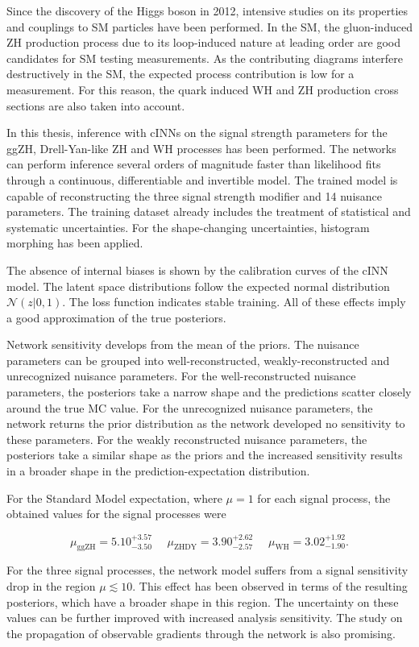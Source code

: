 \label{sec:conclusion}

Since the discovery of the Higgs boson in 2012, intensive studies on its properties and couplings to SM particles have been performed. In the SM, the gluon-induced ZH production process due to its loop-induced nature at leading order are good candidates for SM testing measurements. As the contributing diagrams interfere destructively in the SM, the expected process contribution is low for a measurement. For this reason, the quark induced WH and ZH production cross sections are also taken into account.

In this thesis, inference with cINNs on the signal strength parameters for the ggZH, Drell-Yan-like ZH and WH processes has been performed. The networks can perform inference several orders of magnitude faster than likelihood fits through a continuous, differentiable and invertible model. The trained model is capable of reconstructing the three signal strength modifier and 14 nuisance parameters. The training dataset already includes the treatment of statistical and systematic uncertainties. For the shape-changing uncertainties, histogram morphing has been applied.

The absence of internal biases is shown by the calibration curves of the cINN model. The latent space distributions follow the expected normal distribution $\mathcal{N}(z | 0,1)$. The loss function indicates stable training. All of these effects imply a good approximation of the true posteriors.

Network sensitivity develops from the mean of the priors. The nuisance parameters can be grouped into well-reconstructed, weakly-reconstructed and unrecognized nuisance parameters. For the well-reconstructed nuisance parameters, the posteriors take a narrow shape and the predictions scatter closely around the true MC value. For the unrecognized nuisance parameters, the network returns the prior distribution as the network developed no sensitivity to these parameters. For the weakly reconstructed nuisance parameters, the posteriors take a similar shape as the priors and the increased sensitivity results in a broader shape in the prediction-expectation distribution.

For the Standard Model expectation, where $\mu=1$ for each signal process, the obtained values for the signal processes were

\begin{equation*}
	\mu_\text{ggZH} = 5.10^{+3.57}_{-3.50} \, \, \quad \mu_\text{ZHDY} = 3.90^{+2.62}_{-2.57} \, \, \quad \mu_\text{WH} = 3.02^{+1.92}_{-1.90}.
\end{equation*}

For the three signal processes, the network model suffers from a signal sensitivity drop in the region $\mu\lesssim10$. This effect has been observed in terms of the resulting posteriors, which have a broader shape in this region. The uncertainty on these values can be further improved with increased analysis sensitivity. The study on the propagation of observable gradients through the network is also promising.